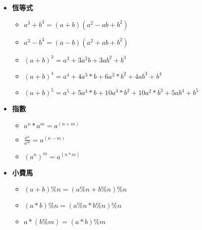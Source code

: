 \begin{itemize}
  

  \item \textbf{恆等式}
  \begin{itemize}
    \item $a^3+b^3 = (a+b)(a^2-ab+b^2)$
    \item $a^3-b^3 = (a-b)(a^2+ab+b^2)$
    \item $(a+b)^3 = a^3+3a^2b+3ab^2+b^3$
    \item $(a+b)^4 = a^4+4a^3*b+6a^2*b^2+4ab^3+b^4$
    \item $(a+b)^5 = a^5+5a^4*b+10a^3*b^2+10a^2*b^3+5ab^4+b^5$
  \end{itemize}

  \item \textbf{指數}
  \begin{itemize}
    \item $a^n*a^m = a^(n+m)$
    \item $\frac{a^n}{a^m} = a^(n-m)$
    \item $(a^n)^m = a^(n*m)$
  \end{itemize}

  
  \item \textbf{小費馬}
  \begin{itemize}
    \item $(a+b)\%n = (a\%n+b\%n)\%n$
    \item $(a*b)\%n = (a\%n*b\%n)\%n$
    \item $a*(b\%m) = (a*b)\%m$
  \end{itemize}
\end{itemize}
